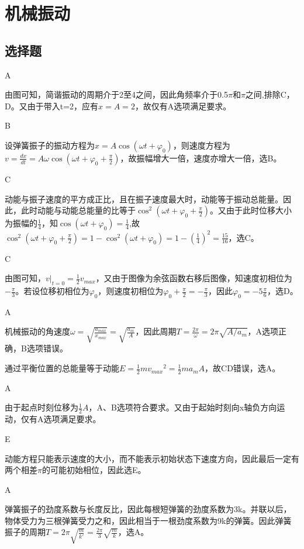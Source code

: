 \chapter{机械振动}
\section{选择题}
\exercise A

\solve
由图可知，简谐振动的周期介于2至4之间，因此角频率介于0.5$\pi$和$\pi$之间,排除C，D。又由于带入t=2，应有$x=A=2$，故仅有A选项满足要求。

\exercise B

\solve
设弹簧振子的振动方程为$x=A\cos(\omega t+\varphi_0)$，则速度方程为$v=\frac{dx}{dt}=A\omega\cos(\omega t+\varphi_0+\frac{\pi}{2})$，故振幅增大一倍，速度亦增大一倍，选B。

\exercise C

\solve
动能与振子速度的平方成正比，且在振子速度最大时，动能等于振动总能量。因此，此时动能与动能总能量的比等于$\cos^2(\omega t+\varphi_0+\frac{\pi}{2})$。又由于此时位移大小为振幅的$\frac{1}{4}$，知$\cos(\omega t+\varphi_0)=\frac{1}{4}$,故$\cos^2(\omega t+\varphi_0+\frac{\pi}{2})=1-\cos^2(\omega t+\varphi_0)=1-\left(\frac{1}{4}\right)^2=\frac{15}{16}$，选C。

\exercise C

\solve
由图可知，$v|_{t=0}=\frac{1}{2}v_{max}$，又由于图像为余弦函数右移后图像，知速度初相位为$-\frac{\pi}{3}$。若设位移初相位为$\varphi_0$，则速度初相位为$\varphi_0+\frac{\pi}{2}=-\frac{\pi}{3}$，因此$\varphi_0=-5\frac{\pi}{6}$，选D。

\exercise A

\solve
机械振动的角速度$\omega=\sqrt{\frac{a_{max}}{x_{max}}}=\sqrt{\frac{a_m}{A}}$，因此周期$T=\frac{2\pi}{\omega}=2\pi\sqrt{A/a_m}$，A选项正确，B选项错误。\par
通过平衡位置的总能量等于动能$E=\frac{1}{2}mv{_{max}}^2=\frac{1}{2}ma{_m}A$，故CD错误，选A。

\exercise A

\solve
由于起点时刻位移为$\frac{1}{2}A$，A、B选项符合要求。又由于起始时刻向x轴负方向运动，仅有A选项满足要求。

\exercise E

\solve
动能方程只能表示速度的大小，而不能表示初始状态下速度方向，因此最后一定有两个相差$\pi$的可能初始相位，因此选E。

\exercise A

\solve
弹簧振子的劲度系数与长度反比，因此每根短弹簧的劲度系数为3k。并联以后，物体受力为三根弹簧受力之和，因此相当于一根劲度系数为9k的弹簧。因此弹簧振子的周期$T=2\pi\sqrt{\frac{m}{k'}}=\frac{2\pi}{3}\sqrt{\frac{m}{k}}$，选A。

